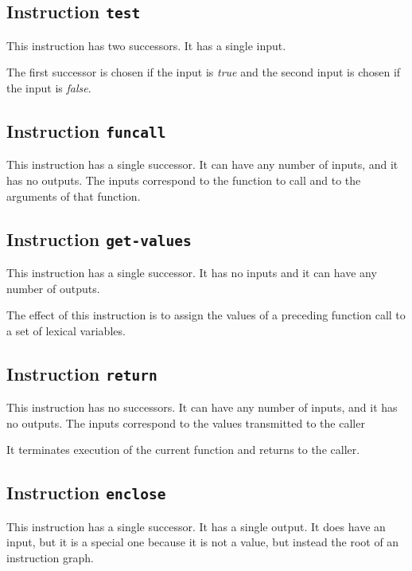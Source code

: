\subsection{Instruction \texttt{test}}
\label{mir-instruction-test}

This instruction has two successors.  It has a single input. 

The first successor is chosen if the input is \emph{true} and the
second input is chosen if the input is \emph{false}.%

\subsection{Instruction \texttt{funcall}}
\label{mir-instruction-funcall}

This instruction has a single successor.  It can have any number of
inputs, and it has no outputs.  The inputs correspond to the function
to call and to the arguments of that function.

\subsection{Instruction \texttt{get-values}}
\label{mir-instruction-get-values}

This instruction has a single successor.  It has no inputs and it can
have any number of outputs.

The effect of this instruction is to assign the values of a preceding
function call to a set of lexical variables. 

\subsection{Instruction \texttt{return}}
\label{mir-instruction-return}

This instruction has no successors.  It can have any number of
inputs, and it has no outputs.  The inputs correspond to the values
transmitted to the caller

It terminates execution of the current function and returns to the
caller. 

\subsection{Instruction \texttt{enclose}}
\label{mir-instruction-enclose}

This instruction has a single successor.  It has a single output. 
It does have an input, but it is a special one because it is not a
value, but instead the root of an instruction graph.  

